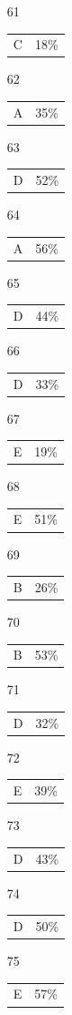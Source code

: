 \documentclass[12pt]{article}
\begin{document}
\begin{multicols}{5}
\begin{enumerate}
\item[61] \begin{tabular}{cc} C & 18\%\end{tabular}
\item[62] \begin{tabular}{cc} A & 35\%\end{tabular}
\item[63] \begin{tabular}{cc} D & 52\%\end{tabular}
\item[64] \begin{tabular}{cc} A & 56\%\end{tabular}
\item[65] \begin{tabular}{cc} D & 44\%\end{tabular}
\item[]
\item[66] \begin{tabular}{cc} D & 33\%\end{tabular}
\item[67] \begin{tabular}{cc} E & 19\%\end{tabular}
\item[68] \begin{tabular}{cc} E & 51\%\end{tabular}
\item[69] \begin{tabular}{cc} B & 26\%\end{tabular}
\item[70] \begin{tabular}{cc} B & 53\%\end{tabular}
\item[]
\item[71] \begin{tabular}{cc} D & 32\%\end{tabular}
\item[72] \begin{tabular}{cc} E & 39\%\end{tabular}
\item[73] \begin{tabular}{cc} D & 43\%\end{tabular}
\item[74] \begin{tabular}{cc} D & 50\%\end{tabular}
\item[75] \begin{tabular}{cc} E & 57\%\end{tabular}

\end{enumerate}
\end{multicols}
\end{document}
